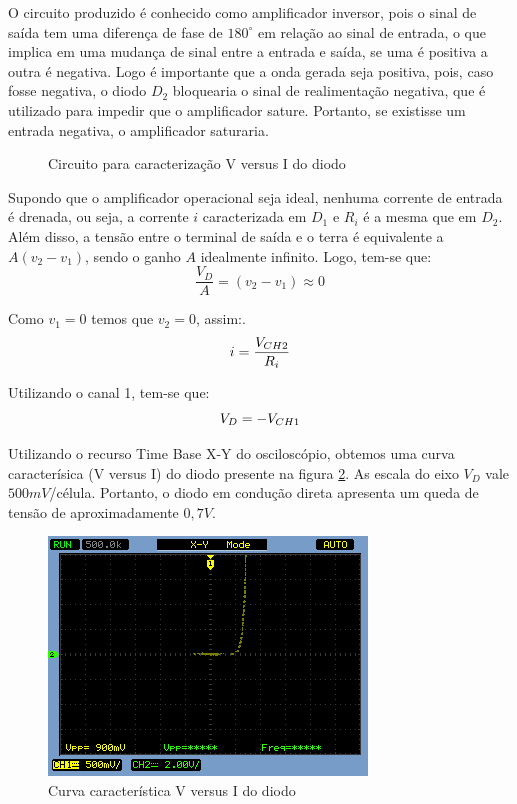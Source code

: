 \documentclass[a4paper]{article} %
\begin{document}
O circuito produzido é conhecido como amplificador inversor, pois o sinal de saída tem uma diferença de fase de $180^{\circ}$ em relação ao sinal de entrada, o que implica em uma mudança de sinal entre a entrada e saída, se uma é positiva a outra é negativa. Logo é importante que a onda gerada seja positiva, pois, caso fosse negativa, o diodo $D_2$ bloquearia o sinal de realimentação negativa, que é utilizado para impedir que o amplificador sature. Portanto, se existisse um entrada negativa, o amplificador saturaria.

\vspace{3mm}
\begin{figure}[h]
\centerline{}
\caption{Circuito para caracterização V versus I do diodo \label{circ:1}}
\end{figure}

Supondo que o amplificador operacional seja ideal, nenhuma corrente de entrada é drenada, ou seja, a corrente $i$ caracterizada em $D_1$ e $R_i$ é a mesma que em $D_2$. Além disso, a tensão entre o terminal de saída e o terra é equivalente a $A(v_2-v_1)$, sendo o ganho $A$ idealmente infinito. Logo, tem-se que:
\begin{equation}
\frac{V_D}{A}=(v_2-v_1)\approx0
\end{equation}

Como $v_1=0$ temos que $v_2=0$, assim:.
\begin{equation}
i=\frac{V_{CH2}}{R_{i}}\\
\end{equation}

Utilizando o canal 1, tem-se que:  
\begin{equation}
V_D=-V_{CH1}\\
\end{equation}


Utilizando o recurso Time Base X-Y do osciloscópio, obtemos uma curva caracterísica (V versus I) do diodo presente na figura \ref{fig:q1-curva2}. As escala do eixo $V_D$ vale $500mV$/célula. Portanto, o diodo em condução direta apresenta um queda de tensão de aproximadamente $0,7V$.    
\begin{figure}[h]
\begin{centering}
\includegraphics[scale=0.6]{Imagens/3.1/NewFile0} \caption{Curva característica V versus I do diodo  \label{fig:q1-curva2}}
\par\end{centering}
\end{figure}
\end{document}
